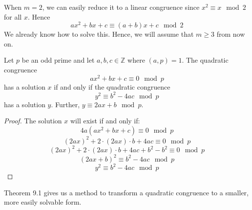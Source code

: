 \documentclass[12pt,letterpaper]{book}
\theoremstyle{definition}
\newcommand{\Z}{\mathbb{Z}}
\begin{document}
When $m=2$, we can easily reduce it to a linear congruence since $x^2 \equiv x \mod 2$ for all $x$. Hence
\[ax^2 + bx + c \equiv (a+b)x + c \mod 2\]
We already know how to solve this. Hence, we will assume that $m \geq 3$ from now on.

\begin{theorem}
Let $p$ be an odd prime and let $a,b,c \in \Z$ where $(a,p) = 1$. The quadratic congruence
\[ax^2 + bx + c \equiv 0 \mod p\]
has a solution $x$ if and only if the quadratic congruence
\[y^2 \equiv b^2 - 4ac \mod p\]
has a solution $y$. Further, $y \equiv 2ax + b \mod p$.
\end{theorem}
\begin{proof}
  The solution $x$ will exist if and only if:
  \[4a(ax^2 + bx + c) \equiv 0 \mod p\] 
  \[(2ax)^2 + 2 \cdot (2ax) \cdot b + 4ac \equiv 0 \mod p\]
  \[(2ax)^2 + 2 \cdot (2ax) \cdot b + 4ac + b^2 - b^2 \equiv 0 \mod p\]
  \[(2ax + b)^2 \equiv b^2-4ac \mod p\]
  \[y^2 \equiv b^2 - 4ac \mod p\]
\end{proof}
Theorem 9.1 gives us a method to transform a quadratic congruence to a smaller, more easily solvable form.
\end{document}
